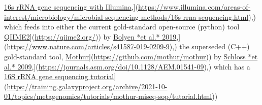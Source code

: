 \documentclass[
]{book}
\begin{document}
\href{\%5Bhttps://www.illumina.com/areas-of-interest/microbiology/microbial-sequencing-methods/16s-rrna-sequencing.html}{16s rRNA gene sequencing with Illumina},{]}(\url{https://www.illumina.com/areas-of-interest/microbiology/microbial-sequencing-methods/16s-rrna-sequencing.html}),) which feeds into either the current gold-standard open-source (python) tool \href{\%5Bhttps://qiime2.org/}{QIIME2}{]}(\url{https://qiime2.org/})) by \href{\%5Bhttps://www.nature.com/articles/s41587-019-0209-9}{Bolyen *et al.* 2019},{]}(\url{https://www.nature.com/articles/s41587-019-0209-9}),) the superseded (C++) gold-standard tool, \href{\%5Bhttps://github.com/mothur/mothur}{Mothur}{]}(\url{https://github.com/mothur/mothur})) by \href{\%5Bhttps://journals.asm.org/doi/10.1128/AEM.01541-09}{Schloss *et al.* 2009},{]}(\url{https://journals.asm.org/doi/10.1128/AEM.01541-09}),) which has a \href{\%5Bhttps://training.galaxyproject.org/archive/2021-10-01/topics/metagenomics/tutorials/mothur-miseq-sop/tutorial.html}{16S rRNA gene sequencing tutorial}{]}(\url{https://training.galaxyproject.org/archive/2021-10-01/topics/metagenomics/tutorials/mothur-miseq-sop/tutorial.html}))
\end{document}
